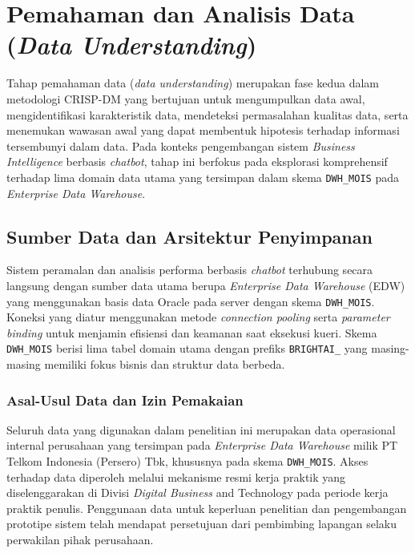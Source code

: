 \section{Pemahaman dan Analisis Data (\textit{Data Understanding})}

Tahap pemahaman data (\textit{data understanding}) merupakan fase kedua dalam metodologi CRISP-DM yang bertujuan untuk mengumpulkan data awal, mengidentifikasi karakteristik data, mendeteksi permasalahan kualitas data, serta menemukan wawasan awal yang dapat membentuk hipotesis terhadap informasi tersembunyi dalam data. Pada konteks pengembangan sistem \textit{Business Intelligence} berbasis \textit{chatbot}, tahap ini berfokus pada eksplorasi komprehensif terhadap lima domain data utama yang tersimpan dalam skema \texttt{DWH\_MOIS} pada \textit{Enterprise Data Warehouse}.

\subsection{Sumber Data dan Arsitektur Penyimpanan}

Sistem peramalan dan analisis performa berbasis \textit{chatbot} terhubung secara langsung dengan sumber data utama berupa \textit{Enterprise Data Warehouse} (EDW)\label{abbr:EDW} yang menggunakan basis data Oracle pada server dengan skema \texttt{DWH\_MOIS}. Koneksi yang diatur menggunakan metode \textit{connection pooling} serta \textit{parameter binding} untuk menjamin efisiensi dan keamanan saat eksekusi kueri. Skema \texttt{DWH\_MOIS} berisi lima tabel domain utama dengan prefiks \texttt{BRIGHTAI\_} yang masing-masing memiliki fokus bisnis dan struktur data berbeda.

\subsubsection{Asal-Usul Data dan Izin Pemakaian}

Seluruh data yang digunakan dalam penelitian ini merupakan data operasional internal perusahaan yang tersimpan pada \textit{Enterprise Data Warehouse} milik PT Telkom Indonesia (Persero) Tbk, khususnya pada skema \texttt{DWH\_MOIS}. Akses terhadap data diperoleh melalui mekanisme resmi kerja praktik yang diselenggarakan di Divisi \textit{Digital Business} and Technology pada periode kerja praktik penulis. Penggunaan data untuk keperluan penelitian dan pengembangan prototipe sistem telah mendapat persetujuan dari pembimbing lapangan selaku perwakilan pihak perusahaan.

